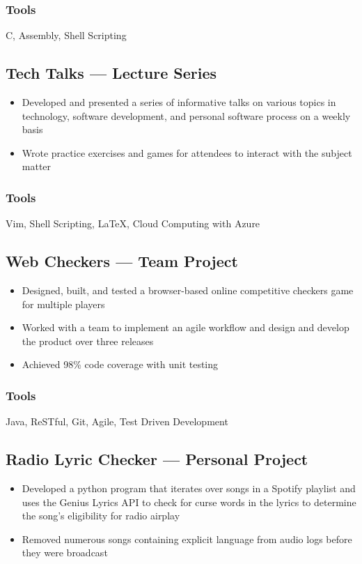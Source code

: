 \documentclass[11pt, letterpaper]{article}
\begin{document}
            \subsubsection{Tools}
                C, Assembly, Shell Scripting

        \subsection{Tech Talks --- Lecture Series}
            \begin{itemize}[nosep]
                \item Developed and presented a series of informative talks on various topics in technology, 
                    software development, and personal software process on a weekly basis
                \item Wrote practice exercises and games for attendees to interact with the subject matter
            \end{itemize}
            \subsubsection{Tools}
                Vim, Shell Scripting, LaTeX, Cloud Computing with Azure

        \subsection{Web Checkers --- Team Project}
            \begin{itemize}[nosep]
                \item Designed, built, and tested a browser-based online competitive checkers game for multiple 
                    players
                \item Worked with a team to implement an agile workflow and design and develop the product 
                    over three releases
                \item Achieved 98\% code coverage with unit testing
            \end{itemize}
            \subsubsection{Tools}
                Java, ReSTful, Git, Agile, Test Driven Development

        \subsection{Radio Lyric Checker --- Personal Project}
            \begin{itemize}[nosep]
                \item Developed a python program that iterates over songs in a Spotify playlist and uses the Genius 
                    Lyrics API to check for curse words in the lyrics to determine the song's eligibility for radio 
                    airplay 
                \item Removed numerous songs containing explicit language from audio logs before they were broadcast
            \end{itemize}
\end{document}
